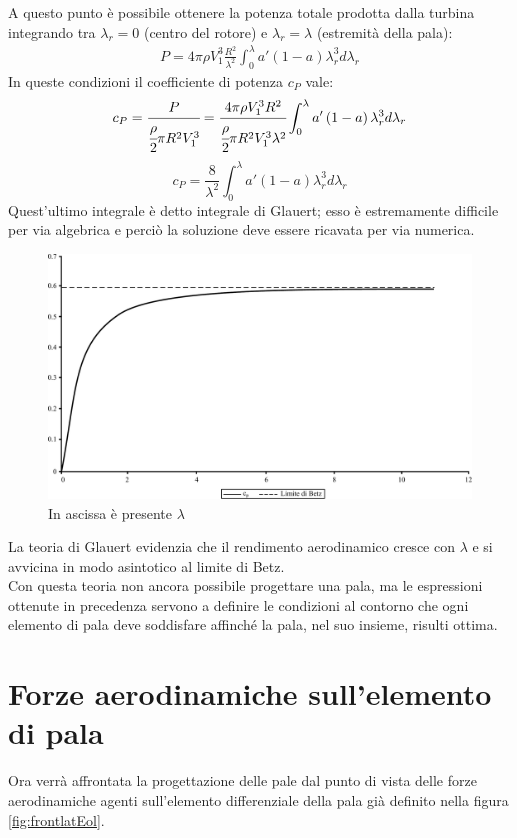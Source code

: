 A questo punto è possibile ottenere la potenza totale prodotta dalla turbina integrando tra $\lambda_r = 0$ (centro del rotore) e $\lambda_r = \lambda$ (estremità della pala):
\begin{align*}
P = 4 \pi \rho V_1^3 \frac{R^2}{\lambda^2} \int_0^{\lambda} a' \left( 1 - a \right) \lambda_r^3 d \lambda_r
\end{align*}
In queste condizioni il coefficiente di potenza $c_P$ vale:
\begin{align*}
c_P = \cfrac{P}{\cfrac{\rho}{2} \pi R^2 V_1^3} = \cfrac{4 \pi \rho V_1^3 R^2}{\cfrac{\rho}{2} \pi R^2  V_1^3 \lambda^2} \int_0^{\lambda} a' \left(1 - a \right) \lambda_r^3 d \lambda_r
\end{align*}
\begin{equation}
c_P = \frac{8}{\lambda^2} \int_0^{\lambda} a' \left( 1 - a \right) \lambda_r^3 d \lambda_r
\end{equation}
Quest'ultimo integrale è detto integrale di Glauert; esso è estremamente difficile per via algebrica e perciò la soluzione deve essere ricavata per via numerica.
\begin{figure}[h!]
\centering
  \includegraphics[width=.7\textwidth]{fig/limBetz.pdf}
\caption{In ascissa è presente $\lambda$}
\label{fig:limBetz}
\end{figure}
La teoria di Glauert evidenzia che il rendimento aerodinamico cresce con $\lambda$ e si avvicina in modo asintotico al limite di Betz. \\
Con questa teoria non ancora possibile progettare una pala, ma le espressioni ottenute in precedenza servono a definire le condizioni al contorno che ogni elemento di pala deve soddisfare affinché la pala, nel suo insieme, risulti ottima.

\section{Forze aerodinamiche sull'elemento di pala}
Ora verrà affrontata la progettazione delle pale dal punto di vista delle forze aerodinamiche agenti sull'elemento differenziale della pala già definito nella figura \ref{fig:frontlatEol}. 

